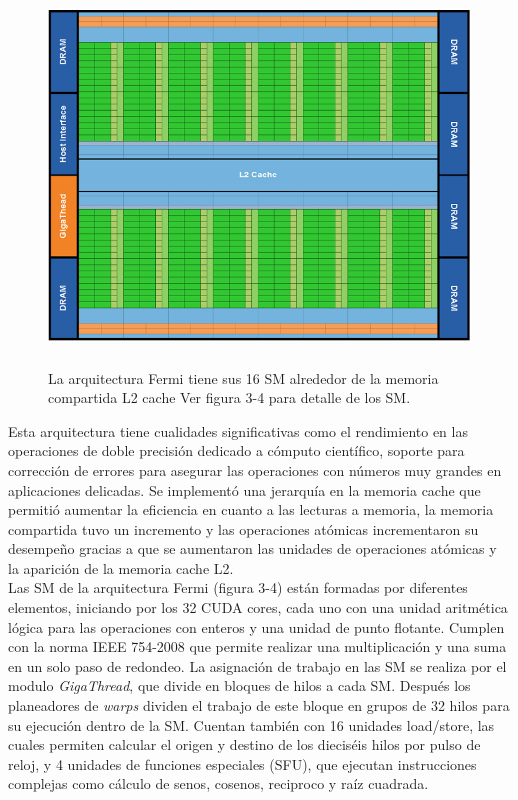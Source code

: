 \begin{figure}[H]
                      \centering
                              \includegraphics[height=10cm]{img/ArqFermi.png}
                      \caption{La arquitectura Fermi tiene sus 16 SM alrededor de la memoria compartida L2 cache \cite{fermi} Ver figura 3-4 para detalle de los SM.}
\end{figure}
Esta arquitectura tiene cualidades significativas como el rendimiento en las operaciones de doble precisión dedicado a cómputo científico, soporte para corrección de errores para asegurar las operaciones con números muy grandes en aplicaciones delicadas. Se implementó una jerarquía en la memoria cache que permitió aumentar la eficiencia en cuanto a las  lecturas a memoria, la memoria compartida tuvo un incremento y las operaciones atómicas incrementaron su desempeño gracias a que se aumentaron las unidades de operaciones atómicas y la aparición de la memoria cache L2.\\
Las SM de la arquitectura Fermi (figura 3-4) están formadas por diferentes elementos, iniciando por los 32 CUDA cores, cada uno con una unidad aritmética lógica para las operaciones con enteros y una unidad de punto flotante. Cumplen con la norma IEEE 754-2008 que permite realizar una multiplicación y una suma en un solo paso de redondeo. La asignación de trabajo en las SM se realiza por el modulo \textit{GigaThread}, que divide en bloques de hilos a cada SM. Después los planeadores de \textit{warps} dividen el trabajo de este bloque en grupos de 32 hilos para su ejecución dentro de la SM. Cuentan también con 16 unidades load/store, las cuales permiten calcular el origen y destino de los dieciséis hilos por pulso de reloj, y 4 unidades de funciones especiales (SFU), que ejecutan instrucciones complejas como cálculo de senos, cosenos, reciproco y raíz cuadrada. 
